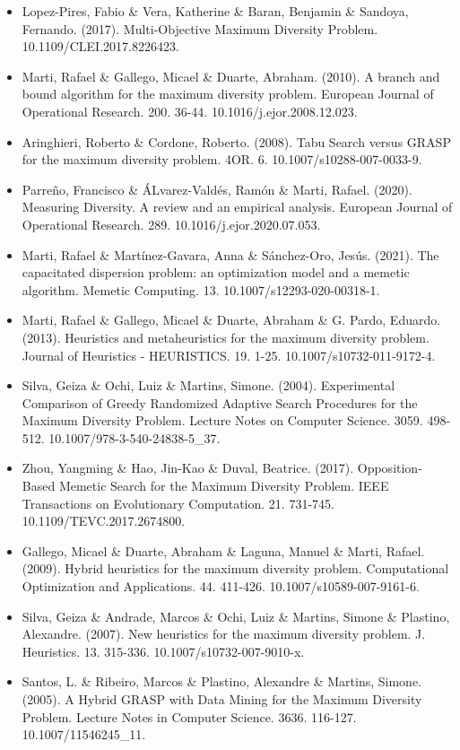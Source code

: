 \documentclass[13pt,a4paper]{article}
\begin{document}
\begin{itemize}
    \item Lopez-Pires, Fabio \& Vera, Katherine \& Baran, Benjamin \& Sandoya, Fernando. (2017). Multi-Objective Maximum Diversity Problem. 10.1109/CLEI.2017.8226423.
    \item Marti, Rafael \& Gallego, Micael \& Duarte, Abraham. (2010). A branch and bound algorithm for the maximum diversity problem. European Journal of Operational Research. 200. 36-44. 10.1016/j.ejor.2008.12.023. 
    \item Aringhieri, Roberto \& Cordone, Roberto. (2008). Tabu Search versus GRASP for the maximum diversity problem. 4OR. 6. 10.1007/s10288-007-0033-9. 
    \item Parreño, Francisco \& ÁLvarez-Valdés, Ramón \& Marti, Rafael. (2020). Measuring Diversity. A review and an empirical analysis. European Journal of Operational Research. 289. 10.1016/j.ejor.2020.07.053. 
    \item Marti, Rafael \& Martínez-Gavara, Anna \& Sánchez-Oro, Jesús. (2021). The capacitated dispersion problem: an optimization model and a memetic algorithm. Memetic Computing. 13. 10.1007/s12293-020-00318-1. 
    \item Marti, Rafael \& Gallego, Micael \& Duarte, Abraham \& G. Pardo, Eduardo. (2013). Heuristics and metaheuristics for the maximum diversity problem. Journal of Heuristics - HEURISTICS. 19. 1-25. 10.1007/s10732-011-9172-4. 
    \item Silva, Geiza \& Ochi, Luiz \& Martins, Simone. (2004). Experimental Comparison of Greedy Randomized Adaptive Search Procedures for the Maximum Diversity Problem. Lecture Notes on Computer Science. 3059. 498-512. 10.1007/978-3-540-24838-5\_37. 
    \item Zhou, Yangming \& Hao, Jin-Kao \& Duval, Beatrice. (2017). Opposition-Based Memetic Search for the Maximum Diversity Problem. IEEE Transactions on Evolutionary Computation. 21. 731-745. 10.1109/TEVC.2017.2674800. 
    \item Gallego, Micael \& Duarte, Abraham \& Laguna, Manuel \& Marti, Rafael. (2009). Hybrid heuristics for the maximum diversity problem. Computational Optimization and Applications. 44. 411-426. 10.1007/s10589-007-9161-6. 
    \item Silva, Geiza \& Andrade, Marcos \& Ochi, Luiz \& Martins, Simone \& Plastino, Alexandre. (2007). New heuristics for the maximum diversity problem. J. Heuristics. 13. 315-336. 10.1007/s10732-007-9010-x. 
    \item Santos, L. \& Ribeiro, Marcos \& Plastino, Alexandre \& Martins, Simone. (2005). A Hybrid GRASP with Data Mining for the Maximum Diversity Problem. Lecture Notes in Computer Science. 3636. 116-127. 10.1007/11546245\_11. 

\end{itemize}
\end{document}
